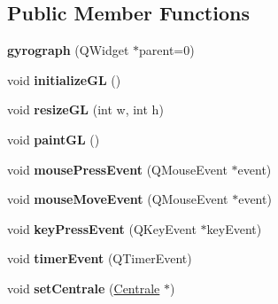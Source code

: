 \subsection*{Public Member Functions}
\begin{DoxyCompactItemize}
\item 
\hypertarget{classgyrograph_a6a2fa93c8602366bedc6fbb849db366a}{{\bfseries gyrograph} (Q\-Widget $\ast$parent=0)}\label{classgyrograph_a6a2fa93c8602366bedc6fbb849db366a}

\item 
\hypertarget{classgyrograph_ac9a97e1ead056e7415b44ed99b393a78}{void {\bfseries initialize\-G\-L} ()}\label{classgyrograph_ac9a97e1ead056e7415b44ed99b393a78}

\item 
\hypertarget{classgyrograph_a05a4954cd7e1e8ab6af01c8ff71bb635}{void {\bfseries resize\-G\-L} (int w, int h)}\label{classgyrograph_a05a4954cd7e1e8ab6af01c8ff71bb635}

\item 
\hypertarget{classgyrograph_a9d3e62bb8f672e39d1c9eba10894fc23}{void {\bfseries paint\-G\-L} ()}\label{classgyrograph_a9d3e62bb8f672e39d1c9eba10894fc23}

\item 
\hypertarget{classgyrograph_a35b760b781e46d03a2f84e5f324af449}{void {\bfseries mouse\-Press\-Event} (Q\-Mouse\-Event $\ast$event)}\label{classgyrograph_a35b760b781e46d03a2f84e5f324af449}

\item 
\hypertarget{classgyrograph_a609d5b7880bfc3cb994413ff7f98e76d}{void {\bfseries mouse\-Move\-Event} (Q\-Mouse\-Event $\ast$event)}\label{classgyrograph_a609d5b7880bfc3cb994413ff7f98e76d}

\item 
\hypertarget{classgyrograph_a0acf4e4fbf1ad80bbb08f7647d669c34}{void {\bfseries key\-Press\-Event} (Q\-Key\-Event $\ast$key\-Event)}\label{classgyrograph_a0acf4e4fbf1ad80bbb08f7647d669c34}

\item 
\hypertarget{classgyrograph_ac36fb3e2bb8d140480879a2961a81dd3}{void {\bfseries timer\-Event} (Q\-Timer\-Event)}\label{classgyrograph_ac36fb3e2bb8d140480879a2961a81dd3}

\item 
\hypertarget{classgyrograph_ad768ef4e4b9407f333627e543004b2a0}{void {\bfseries set\-Centrale} (\hyperlink{class_centrale}{Centrale} $\ast$)}\label{classgyrograph_ad768ef4e4b9407f333627e543004b2a0}


\end{DoxyCompactItemize}
